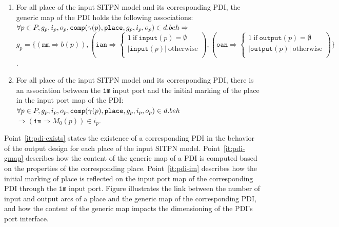 \begin{definition}
\begin{enumerate}[resume]
  \item\label{it:pdi-gmap} For all place of the input SITPN model and its corresponding PDI, the generic map of the PDI holds the following associations:\\
    $\forall{}p\in{}P,g_p,i_p,o_p,\mathtt{comp}(\gamma(p),\mathtt{place},g_p,i_p,o_p)\in{}d.beh\Rightarrow$\\
    $g_p=\{(\mathtt{mm}\Rightarrow{}b(p)), (\mathtt{ian}\Rightarrow
    \begin{cases}
      1~\mathrm{if}~\mathtt{input}(p)=\emptyset \\
      \vert{}\mathtt{input}(p)\vert~\mathrm{otherwise} \\
    \end{cases}),
    (\mathtt{oan}\Rightarrow
    \begin{cases}
      1~\mathrm{if}~\mathtt{output}(p)=\emptyset \\
      \vert{}\mathtt{output}(p)\vert~\mathrm{otherwise} \\
    \end{cases})\}$.
    
  \item\label{it:pdi-im} For all place of the input SITPN model and
    its corresponding PDI, there is an association between the
    \texttt{im} input port and the initial marking of the place in the
    input port map of the PDI:\\
    $\forall{}p\in{}P,g_p,i_p,o_p,\mathtt{comp}(\gamma(p),\mathtt{place},g_p,i_p,o_p)\in{}d.beh{}$
    $\Rightarrow(\mathtt{im}\Rightarrow{}M_0(p))\in{}i_p$.
  \end{enumerate}

  \bigskip

  Point~\ref{it:pdi-exists} states the existence of a corresponding
  PDI in the behavior of the output design for each place of the input
  SITPN model. Point~\ref{it:pdi-gmap} describes how the content of
  the generic map of a PDI is computed based on the properties of the
  corresponding place. Point~\ref{it:pdi-im} describes how the initial
  marking of place is reflected on the input port map of the
  corresponding PDI through the \texttt{im} input port. Figure
  illustrates the link between the number of input and output arcs of
  a place and the generic map of the corresponding PDI, and how the
  content of the generic map impacts the dimensioning of the PDI's
  port interface.


\end{definition}
